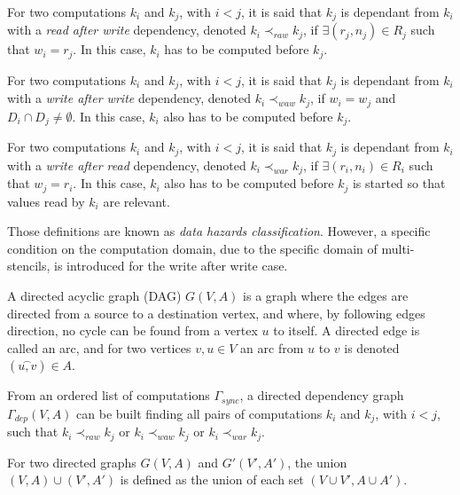 \begin{mydef}
For two computations $k_i$ and $k_j$, with $i < j$, it is said that $k_j$ is dependant from $k_i$ with a \emph{read after write} dependency, denoted $k_i \prec_{raw} k_j$, if $\exists (r_j,n_j) \in R_j$ such that $w_i=r_j$. In this case, $k_i$ has to be computed before $k_j$.
\end{mydef}

\begin{mydef}
For two computations $k_i$ and $k_j$, with $i < j$, it is said that $k_j$ is dependant from $k_i$ with a \emph{write after write} dependency, denoted $k_i \prec_{waw} k_j$, if $w_i = w_j$ and $D_i \cap D_j \neq \emptyset$. In this case, $k_i$ also has to be computed before $k_j$.
\end{mydef}

\begin{mydef}
For two computations $k_i$ and $k_j$, with $i < j$, it is said that $k_j$ is dependant from $k_i$ with a \emph{write after read} dependency, denoted $k_i \prec_{war} k_j$, if $\exists (r_i,n_i) \in R_i$ such that $w_j=r_i$. In this case, $k_i$ also has to be computed before $k_j$ is started so that values read by $k_i$ are relevant.
\end{mydef}

Those definitions are known as \emph{data hazards classification}. However, a specific condition on the computation domain, due to the specific domain of multi-stencils, is introduced for the write after write case.

\begin{mydef}
A directed acyclic graph (DAG) $G(V,A)$ is a graph where the edges are directed from a source to a destination vertex, and where, by following edges direction, no cycle can be found from a vertex $u$ to itself. A directed edge is called an arc, and for two vertices $v,u \in V$ an arc from $u$ to $v$ is denoted $(\overset{\frown}{u,v}) \in A$.
\end{mydef}

From an ordered list of computations $\Gamma_{sync}$, a directed dependency graph $\Gamma_{dep}(V,A)$ can be built finding all pairs of computations $k_i$ and $k_j$, with $i<j$, such that $k_i \prec_{raw} k_j$ or $k_i \prec_{waw} k_j$ or $k_i \prec_{war} k_j$. 

\begin{mydef}
For two directed graphs $G(V,A)$ and $G'(V',A')$, the union $(V,A)\cup (V',A')$ is defined as the union of each set $(V\cup V', A \cup A')$.
\end{mydef}


